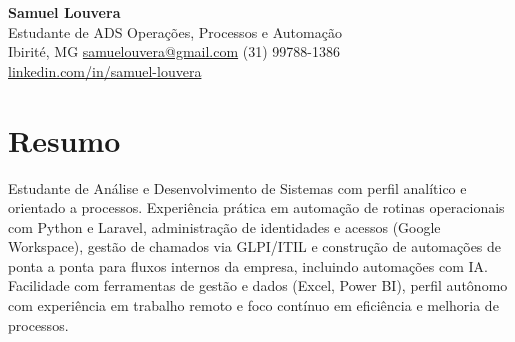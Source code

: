 \documentclass[11pt,a4paper]{article}
\begin{document}
{\LARGE\bfseries\color{accent} Samuel Louvera}\\[3pt]
{\large Estudante de ADS \textbar{} Operações, Processos e Automação}\\[5pt]
Ibirité, MG \quad\textbullet\quad
\href{mailto:samuelouvera@gmail.com}{samuelouvera@gmail.com} \quad\textbullet\quad
(31) 99788-1386\\
\href{https://linkedin.com/in/samuel-louvera}{linkedin.com/in/samuel-louvera}

\section{Resumo}
Estudante de Análise e Desenvolvimento de Sistemas com perfil analítico e orientado a processos.
Experiência prática em automação de rotinas operacionais com Python e Laravel, administração de
identidades e acessos (Google Workspace), gestão de chamados via GLPI/ITIL e construção de
automações de ponta a ponta para fluxos internos da empresa, incluindo automações com IA.
Facilidade com ferramentas de gestão e dados (Excel, Power BI), perfil autônomo com experiência em
trabalho remoto e foco contínuo em eficiência e melhoria de processos.

\end{document}
